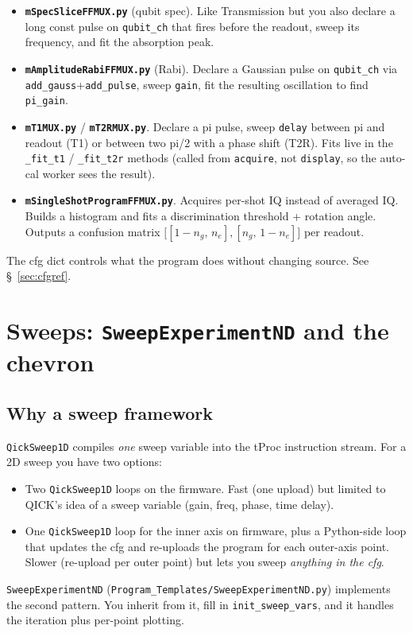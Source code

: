 \documentclass[11pt,letterpaper]{article}
\begin{document}
\begin{itemize}[leftmargin=*]
  \item \textbf{\texttt{mSpecSliceFFMUX.py}} (qubit spec). Like Transmission but you also declare a long const pulse on \texttt{qubit\_ch} that fires before the readout, sweep its frequency, and fit the absorption peak.
  \item \textbf{\texttt{mAmplitudeRabiFFMUX.py}} (Rabi). Declare a Gaussian pulse on \texttt{qubit\_ch} via \texttt{add\_gauss}+\texttt{add\_pulse}, sweep \texttt{gain}, fit the resulting oscillation to find \texttt{pi\_gain}.
  \item \textbf{\texttt{mT1MUX.py}} / \textbf{\texttt{mT2RMUX.py}}. Declare a pi pulse, sweep \texttt{delay} between pi and readout (T1) or between two pi/2 with a phase shift (T2R). Fits live in the \texttt{\_fit\_t1} / \texttt{\_fit\_t2r} methods (called from \texttt{acquire}, not \texttt{display}, so the auto-cal worker sees the result).
  \item \textbf{\texttt{mSingleShotProgramFFMUX.py}}. Acquires per-shot IQ instead of averaged IQ. Builds a histogram and fits a discrimination threshold + rotation angle. Outputs a confusion matrix \(\bigl[[1-n_g,\,n_e],[n_g,\,1-n_e]\bigr]\) per readout.
\end{itemize}

The cfg dict controls what the program does without changing source. See \S~\ref{sec:cfgref}.

\section{Sweeps: \texttt{SweepExperimentND} and the chevron}
\subsection{Why a sweep framework}
\texttt{QickSweep1D} compiles \emph{one} sweep variable into the tProc instruction stream. For a 2D sweep you have two options:
\begin{itemize}[leftmargin=*]
  \item Two \texttt{QickSweep1D} loops on the firmware. Fast (one upload) but limited to QICK's idea of a sweep variable (gain, freq, phase, time delay).
  \item One \texttt{QickSweep1D} loop for the inner axis on firmware, plus a Python-side loop that updates the cfg and re-uploads the program for each outer-axis point. Slower (re-upload per outer point) but lets you sweep \emph{anything in the cfg}.
\end{itemize}
\texttt{SweepExperimentND} (\texttt{Program\_Templates/SweepExperimentND.py}) implements the second pattern. You inherit from it, fill in \texttt{init\_sweep\_vars}, and it handles the iteration plus per-point plotting.
\end{document}
